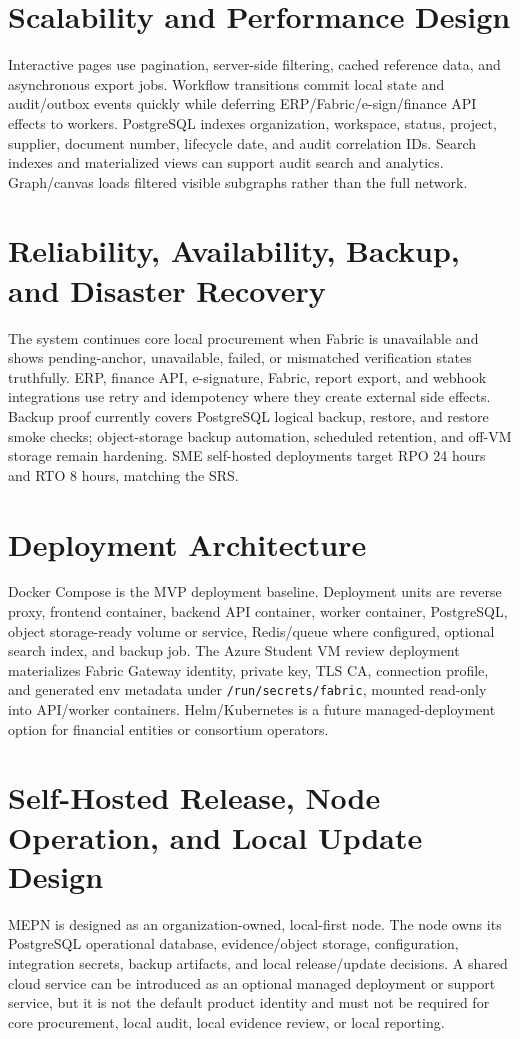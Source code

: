 \documentclass[11pt,a4paper]{article}
\newcommand{\codename}{MEPN}
\begin{document}
\section{Scalability and Performance Design}
Interactive pages use pagination, server-side filtering, cached reference data, and asynchronous export jobs. Workflow transitions commit local state and audit/outbox events quickly while deferring ERP/Fabric/e-sign/finance API effects to workers. PostgreSQL indexes organization, workspace, status, project, supplier, document number, lifecycle date, and audit correlation IDs. Search indexes and materialized views can support audit search and analytics. Graph/canvas loads filtered visible subgraphs rather than the full network.

\section{Reliability, Availability, Backup, and Disaster Recovery}
The system continues core local procurement when Fabric is unavailable and shows pending-anchor, unavailable, failed, or mismatched verification states truthfully. ERP, finance API, e-signature, Fabric, report export, and webhook integrations use retry and idempotency where they create external side effects. Backup proof currently covers PostgreSQL logical backup, restore, and restore smoke checks; object-storage backup automation, scheduled retention, and off-VM storage remain hardening. SME self-hosted deployments target RPO 24 hours and RTO 8 hours, matching the SRS.

\section{Deployment Architecture}
Docker Compose is the MVP deployment baseline. Deployment units are reverse proxy, frontend container, backend API container, worker container, PostgreSQL, object storage-ready volume or service, Redis/queue where configured, optional search index, and backup job. The Azure Student VM review deployment materializes Fabric Gateway identity, private key, TLS CA, connection profile, and generated env metadata under \texttt{/run/secrets/fabric}, mounted read-only into API/worker containers. Helm/Kubernetes is a future managed-deployment option for financial entities or consortium operators.

\section{Self-Hosted Release, Node Operation, and Local Update Design}
\codename{} is designed as an organization-owned, local-first node. The node owns its PostgreSQL operational database, evidence/object storage, configuration, integration secrets, backup artifacts, and local release/update decisions. A shared cloud service can be introduced as an optional managed deployment or support service, but it is not the default product identity and must not be required for core procurement, local audit, local evidence review, or local reporting.
\end{document}

